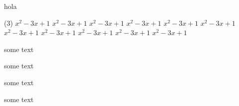 \documentclass[]{presentacion}
\begin{document}
\begin{frame}
hola
\begin{ejercicios}(3)
\ejercicio $x^2-3x+1$
\ejercicio $x^2-3x+1$
\ejercicio $x^2-3x+1$
\ejercicio $x^2-3x+1$
\ejercicio $x^2-3x+1$
\ejercicio $x^2-3x+1$
\ejercicio $x^2-3x+1$
\ejercicio $x^2-3x+1$
\ejercicio $x^2-3x+1$
\ejercicio $x^2-3x+1$
\ejercicio $x^2-3x+1$
\end{ejercicios}

\end{frame}

\begin{frame}

\begin{problema}
  some text
\end{problema}

\begin{problema}[1]
  some text
\end{problema}

\begin{problema}[2]
  some text
\end{problema}

\begin{problema}[3]
  some text
\end{problema}

\end{frame}
\end{document}
